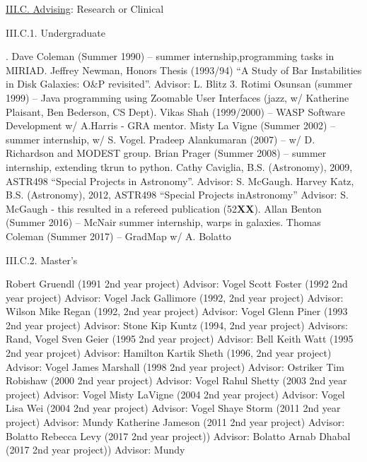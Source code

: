 \documentclass[11pt,letterpaper]{article}
\newcommand{\newi}{\newline\indent}
\begin{document}


\underline{III.C. Advising}: Research or Clinical


III.C.1. Undergraduate

. Dave Coleman (Summer 1990) -- summer internship,programming tasks in MIRIAD\newi
2. Jeffrey Newman, Honors Thesis (1993/94) ``A Study of Bar Instabilities in Disk Galaxies: O\&P revisited''. Advisor: L. Blitz
3. Rotimi Osunsan (summer 1999) -- Java programming using Zoomable User Interfaces (jazz, w/ Katherine Plaisant, Ben Bederson, CS Dept)\newi
4. Vikas Shah (1999/2000) -- WASP Software Development w/ A.Harris - GRA mentor\newi
5. Misty La Vigne (Summer 2002) -- summer internship, w/ S. Vogel\newi
6. Pradeep Alankumaran (2007) -- w/ D. Richardson and MODEST group\newi
7. Brian Prager (Summer 2008) -- summer internship, extending tkrun to python\newi
8. Cathy Caviglia, B.S. (Astronomy), 2009,  ASTR498 ``Special Projects in Astronomy''.  Advisor:  S. McGaugh\newi
9. Harvey Katz, B.S. (Astronomy), 2012,  ASTR498  ``Special Projects inAstronomy''
 Advisor:  S. McGaugh -  this resulted in a refereed publication (52{\bf XX})\newi
10. Allan Benton (Summer 2016) -- McNair summer internship, warps in galaxies\newi
11. Thomas Coleman (Summer 2017) -- GradMap w/ A. Bolatto\newi

          
III.C.2. Master's


Robert Gruendl (1991 2nd year project) Advisor:  Vogel\newi
Scott Foster (1992 2nd year project) Advisor:  Vogel\newi
Jack Gallimore (1992, 2nd year project) Advisor:  Wilson\newi
Mike Regan (1992, 2nd year project) Advisor: Vogel\newi
Glenn Piner (1993 2nd year project) Advisor: Stone\newi
Kip Kuntz (1994, 2nd year project) Advisors:  Rand, Vogel\newi
Sven Geier (1995 2nd year project) Advisor: Bell\newi
Keith Watt (1995 2nd year projcet) Advisor:  Hamilton\newi
Kartik Sheth (1996, 2nd year project) Advisor:  Vogel\newi
James Marshall (1998 2nd year project) Advisor:  Ostriker\newi
Tim Robishaw (2000  2nd year project)  Advisor:  Vogel\newi
Rahul Shetty (2003  2nd year project) Advisor:  Vogel\newi
Misty LaVigne (2004 2nd year project) Advisor: Vogel\newi
Lisa Wei (2004 2nd year project) Advisor: Vogel\newi
Shaye Storm (2011 2nd year project) Advisor: Mundy\newi
Katherine Jameson  (2011 2nd year project) Advisor: Bolatto\newi
Rebecca Levy (2017 2nd year project)) Advisor:  Bolatto\newi
Arnab Dhabal (2017 2nd year project)) Advisor: Mundy\newi
                
\end{document}
